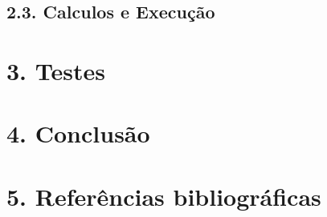\documentclass[12pt, a4paper]{article}
\begin{document}
   \subsection*{2.3. Calculos e Execução}

\section*{3. Testes}

\section*{4. Conclusão}


\section*{5. Referências bibliográficas}
\end{document}
